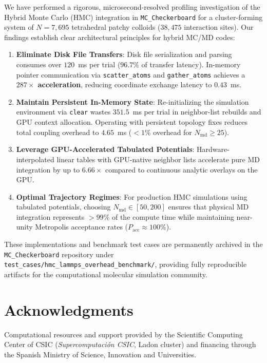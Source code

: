 \documentclass[11pt,a4paper]{article}
\begin{document}
We have performed a rigorous, microsecond-resolved profiling investigation of the Hybrid Monte Carlo (HMC) integration in \texttt{MC\_Checkerboard} for a cluster-forming system of $N = 7{,}695$ tetrahedral patchy colloids ($38{,}475$ interaction sites). Our findings establish clear architectural principles for hybrid MC/MD codes:
\begin{enumerate}
    \item \textbf{Eliminate Disk File Transfers}: Disk file serialization and parsing consumes over $120$~ms per trial ($96.7\%$ of transfer latency). In-memory pointer communication via \texttt{scatter\_atoms} and \texttt{gather\_atoms} achieves a \textbf{$287\times$ acceleration}, reducing coordinate exchange latency to $0.43$~ms.
    \item \textbf{Maintain Persistent In-Memory State}: Re-initializing the simulation environment via \texttt{clear} wastes $351.5$~ms per trial in neighbor-list rebuilds and GPU context allocation. Operating with persistent topology fixes reduces total coupling overhead to $4.65$~ms ($< 1\%$ overhead for $N_{\mathrm{md}} \ge 25$).
    \item \textbf{Leverage GPU-Accelerated Tabulated Potentials}: Hardware-interpolated linear tables with GPU-native neighbor lists accelerate pure MD integration by up to \textbf{$6.66\times$} compared to continuous analytic overlays on the GPU.
    \item \textbf{Optimal Trajectory Regimes}: For production HMC simulations using tabulated potentials, choosing $N_{\mathrm{md}} \in [50, 200]$ ensures that physical MD integration represents $> 99\%$ of the compute time while maintaining near-unity Metropolis acceptance rates ($P_{\mathrm{acc}} \approx 100\%$).
\end{enumerate}

These implementations and benchmark test cases are permanently archived in the \texttt{MC\_Checkerboard} repository under \nolinkurl{test_cases/hmc_lammps_overhead_benchmark/}, providing fully reproducible artifacts for the computational molecular simulation community.

\section*{Acknowledgments}
Computational resources and support provided by the Scientific Computing Center of CSIC (\textit{Supercomputaci\'{o}n CSIC}, Ladon cluster) and financing through the Spanish Ministry of Science, Innovation and Universities.
\end{document}

